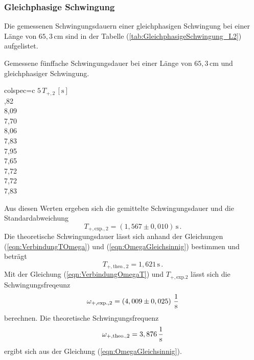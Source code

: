 \subsubsection{Gleichphasige Schwingung}
\label{sec:GleichphasigeSchwingung_LangesPendel}
Die gemessenen Schwingungsdauern einer gleichphasigen Schwingung bei einer Länge von $65,3\, \unit{\centi\meter}$ sind in der Tabelle (\ref{tab:GleichphasigeSchwingung_L2})
aufgelistet. 
\begin{table}[H]
  \centering
  \caption{Gemessene fünffache Schwingungsdauer bei einer Länge von $65,3\, \unit{\centi\meter}$ und gleichphasiger Schwingung.}
  \label{tab:GleichphasigeSchwingung_L2}
  \begin{tblr}{colspec={c}}
      \toprule
      $5\, T_{+, 2}\,\left[\unit{\second}\right]$\\
      ,82 \\
      8,09 \\
      7,70 \\
      8,06 \\
      7,83 \\
      7,95 \\
      7,65 \\
      7,72 \\
      7,72 \\
      7,83 \\
      \bottomrule
  \end{tblr}
\end{table}
Aus diesen Werten ergeben sich die gemittelte Schwingungsdauer und die Standardabweichung
$$T_{+,\text{exp.},2} = \left( 1,567 \pm 0,010 \right)\, \unit{\second}\,.$$
Die theoretische Schwingungsdauer lässt sich anhand der Gleichungen (\ref{eqn:VerbindungTOmega}) und (\ref{eqn:OmegaGleichsinnig}) bestimmen und beträgt
$$T_{+,\text{theo.},2} = 1,621\, \unit{\second}\,.$$
Mit der Gleichung (\ref{eqn:VerbindungOmegaT}) und $T_{+,\text{exp.}2}$ lässt sich die Schwingungsfreqeunz
$$\omega_{+,\text{exp.},2} = \left( 4,009 \pm 0,025 \right)\, \unit[per-mode=fraction]{\per\second}$$ berechnen. 
Die theoretische Schwingungsfrequenz
$$\omega_{+,\text{theo.},2} = 3,876 \, \unit[per-mode=fraction]{\per\second}$$ ergibt sich aus der Gleichung (\ref{eqn:OmegaGleichsinnig}).

%
%
